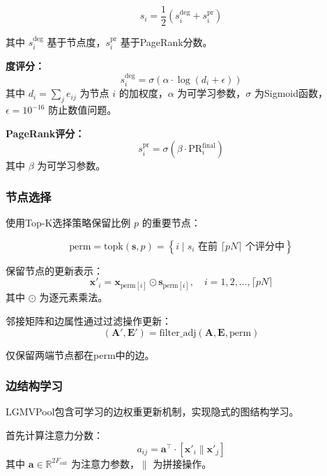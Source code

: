 \documentclass[UTF8, a4paper, 12pt]{article}
\begin{document}
\begin{equation}
s_i = \frac{1}{2} \left( s_i^{\text{deg}} + s_i^{\text{pr}} \right)
\end{equation}

其中 $s_i^{\text{deg}}$ 基于节点度，$s_i^{\text{pr}}$ 基于PageRank分数。

\textbf{度评分：}
\begin{equation}
s_i^{\text{deg}} = \sigma\left( \alpha \cdot \log(d_i + \epsilon) \right)
\end{equation}
其中 $d_i = \sum_j e_{ij}$ 为节点 $i$ 的加权度，$\alpha$ 为可学习参数，$\sigma$ 为Sigmoid函数，$\epsilon = 10^{-16}$ 防止数值问题。

\textbf{PageRank评分：}
\begin{equation}
s_i^{\text{pr}} = \sigma\left( \beta \cdot \text{PR}_i^{\text{final}} \right)
\end{equation}
其中 $\beta$ 为可学习参数。

\subsubsection{节点选择}

使用Top-K选择策略保留比例 $p$ 的重要节点：

\begin{equation}
\text{perm} = \text{topk}(\mathbf{s}, p) = \left\{ i \mid s_i \text{ 在前 } \lceil pN \rceil \text{ 个评分中} \right\}
\end{equation}

保留节点的更新表示：
\begin{equation}
\mathbf{x}'_i = \mathbf{x}_{\text{perm}[i]} \odot \mathbf{s}_{\text{perm}[i]}, \quad i = 1, 2, \ldots, \lceil pN \rceil
\end{equation}
其中 $\odot$ 为逐元素乘法。

邻接矩阵和边属性通过过滤操作更新：
\begin{equation}
(\mathbf{A}', \mathbf{E}') = \text{filter\_adj}(\mathbf{A}, \mathbf{E}, \text{perm})
\end{equation}

仅保留两端节点都在perm中的边。

\subsubsection{边结构学习}

LGMVPool包含可学习的边权重更新机制，实现隐式的图结构学习。

首先计算注意力分数：
\begin{equation}
a_{ij} = \mathbf{a}^{\top} \cdot \left[ \mathbf{x}'_i \parallel \mathbf{x}'_j \right]
\end{equation}
其中 $\mathbf{a} \in \mathbb{R}^{2F_{\text{out}}}$ 为注意力参数，$\parallel$ 为拼接操作。
\end{document}
